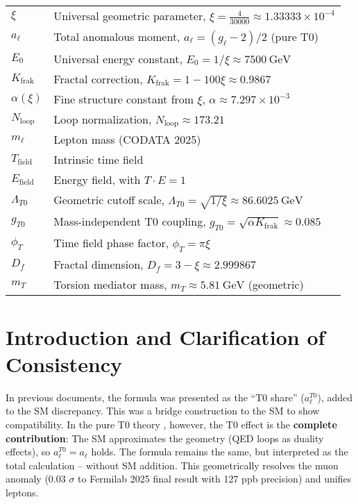 \documentclass[12pt,a4paper]{article}
\begin{document}
	\begin{tabular}{ll}
		$\xi$ & Universal geometric parameter, $\xi = \frac{4}{30000} \approx 1.33333 \times 10^{-4}$ \\
		$a_\ell$ & Total anomalous moment, $a_\ell = (g_\ell - 2)/2$ (pure T0) \\
		$E_0$ & Universal energy constant, $E_0 = 1/\xi \approx \SI{7500}{\giga\electronvolt}$ \\
		$K_\text{frak}$ & Fractal correction, $K_\text{frak} = 1 - 100 \xi \approx 0.9867$ \\
		$\alpha(\xi)$ & Fine structure constant from $\xi$, $\alpha \approx 7.297 \times 10^{-3}$ \\
		$N_\text{loop}$ & Loop normalization, $N_\text{loop} \approx 173.21$ \\
		$m_\ell$ & Lepton mass (CODATA 2025) \\
		$T_\text{field}$ & Intrinsic time field \\
		$E_\text{field}$ & Energy field, with $T \cdot E = 1$ \\
		$\Lambda_{T0}$ & Geometric cutoff scale, $\Lambda_{T0} = \sqrt{1/\xi} \approx \SI{86.6025}{\giga\electronvolt}$ \\
		$g_{T0}$ & Mass-independent T0 coupling, $g_{T0} = \sqrt{\alpha K_\text{frak}} \approx 0.085$ \\
		$\phi_T$ & Time field phase factor, $\phi_T = \pi \xi$ \\
		$D_f$ & Fractal dimension, $D_f = 3 - \xi \approx 2.999867$ \\
		$m_T$ & Torsion mediator mass, $m_T \approx \SI{5.81}{\giga\electronvolt}$ (geometric) \\
	\end{tabular}
	
	\section{Introduction and Clarification of Consistency}
	In previous documents, the formula was presented as the ``T0 share'' ($a_\ell^{T0}$), added to the SM discrepancy. This was a bridge construction to the SM to show compatibility. In the pure T0 theory \cite{T0_SI}, however, the T0 effect is the \textbf{complete contribution}: The SM approximates the geometry (QED loops as duality effects), so $a_\ell^{T0} = a_\ell$ holds. The formula remains the same, but interpreted as the total calculation -- without SM addition. This geometrically resolves the muon anomaly (0.03 $\sigma$ to Fermilab 2025 final result with 127 ppb precision) and unifies leptons.
	
\end{document}
